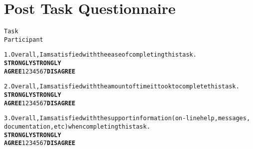 \chapter{Post Task Questionnaire}\label{append_questionnaire}
\begin{alltt}
\normalfont
Task 
Participant 

1. Overall, I am satisfied with the ease of completing this task. 
\textbf{STRONGLY}                                                       \textbf{STRONGLY}
\textbf{AGREE}      1       2       3      4      5      6      7     \textbf{DISAGREE}

2. Overall, I am satisfied with the amount of time it took to complete this task.
\textbf{STRONGLY}                                                       \textbf{STRONGLY}
\textbf{AGREE}      1       2       3      4      5      6      7     \textbf{DISAGREE}

3. Overall, I am satisfied with the support information (on-line help, messages,
documentation, etc) when completing this task.
\textbf{STRONGLY}                                                       \textbf{STRONGLY}
\textbf{AGREE}      1       2       3      4      5      6      7     \textbf{DISAGREE}
\end{alltt}
